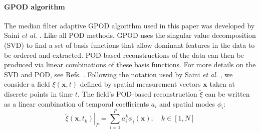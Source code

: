 \documentclass{article}
\begin{document}
\paragraph{GPOD algorithm}
The median filter adaptive GPOD algorithm used in this paper was developed by Saini \textit{et al.} \cite{saini2016development}. Like all POD methods, GPOD uses the singular value decomposition (SVD) to find a set of basis functions that allow dominant features in the data to be ordered and extracted. POD-based reconstructions of the data can then be produced via linear combinations of these basis functions. For more details on the SVD and POD, see Refs. \cite{taira2017modal,brunton2021data}. Following the notation used by Saini \textit{et al.} \cite{saini2016development}, we consider a field $\xi(\mathbf{x}, t)$ defined by spatial measurement vectors $\mathbf{x}$ taken at discrete points in time $t$. The field's POD-based reconstruction $\breve{\xi}$ can be written as a linear combination of temporal coefficients $a_i$ and spatial modes $\phi_i$:
$$
\left.\breve{\xi}\left(\mathbf{x}, t_k\right)\right|_P=\sum_{i=1}^P a_i^k \phi_i(\mathbf{x}) ; \quad k \in[1, N]
$$
\end{document}
